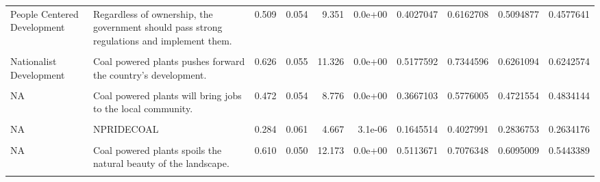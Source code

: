 \documentclass[
]{article}
\begin{document}
\begin{landscape}
\begin{table}[!h]
{\begin{tabular}[t]{l>{\raggedright\arraybackslash}p{4cm}rrrrrrrr}
\addlinespace
People Centered Development & Regardless of ownership, the government should pass strong regulations and implement them. & 0.509 & 0.054 & 9.351 & 0.0e+00 & 0.4027047 & 0.6162708 & 0.5094877 & 0.4577641\\
\cellcolor{gray!6}{Nationalist Development} & \cellcolor{gray!6}{MECHANISATION} & \cellcolor{gray!6}{0.656} & \cellcolor{gray!6}{0.056} & \cellcolor{gray!6}{11.682} & \cellcolor{gray!6}{0.0e+00} & \cellcolor{gray!6}{0.5460463} & \cellcolor{gray!6}{0.7662170} & \cellcolor{gray!6}{0.6561317} & \cellcolor{gray!6}{0.5556245}\\
Nationalist Development & Coal powered plants pushes forward the country's development. & 0.626 & 0.055 & 11.326 & 0.0e+00 & 0.5177592 & 0.7344596 & 0.6261094 & 0.6242574\\
\cellcolor{gray!6}{Nationalist Development} & \cellcolor{gray!6}{Coal powered plants brings economic prosperity to the surrounding regions.} & \cellcolor{gray!6}{0.547} & \cellcolor{gray!6}{0.054} & \cellcolor{gray!6}{10.086} & \cellcolor{gray!6}{0.0e+00} & \cellcolor{gray!6}{0.4408772} & \cellcolor{gray!6}{0.6535573} & \cellcolor{gray!6}{0.5472172} & \cellcolor{gray!6}{0.5535687}\\
NA & Coal powered plants will bring jobs to the local community. & 0.472 & 0.054 & 8.776 & 0.0e+00 & 0.3667103 & 0.5776005 & 0.4721554 & 0.4834144\\
\addlinespace
\cellcolor{gray!6}{NA} & \cellcolor{gray!6}{PRIDECOAL} & \cellcolor{gray!6}{0.338} & \cellcolor{gray!6}{0.062} & \cellcolor{gray!6}{5.485} & \cellcolor{gray!6}{0.0e+00} & \cellcolor{gray!6}{0.2173242} & \cellcolor{gray!6}{0.4590249} & \cellcolor{gray!6}{0.3381745} & \cellcolor{gray!6}{0.3081207}\\
NA & NPRIDECOAL & 0.284 & 0.061 & 4.667 & 3.1e-06 & 0.1645514 & 0.4027991 & 0.2836753 & 0.2634176\\
\cellcolor{gray!6}{NA} & \cellcolor{gray!6}{Coal powered plants poses a great risk to the health of people living around it.} & \cellcolor{gray!6}{0.702} & \cellcolor{gray!6}{0.056} & \cellcolor{gray!6}{12.572} & \cellcolor{gray!6}{0.0e+00} & \cellcolor{gray!6}{0.5927046} & \cellcolor{gray!6}{0.8116380} & \cellcolor{gray!6}{0.7021713} & \cellcolor{gray!6}{0.5798090}\\
NA & Coal powered plants spoils the natural beauty of the landscape. & 0.610 & 0.050 & 12.173 & 0.0e+00 & 0.5113671 & 0.7076348 & 0.6095009 & 0.5443389\\
\cellcolor{gray!6}{NA} & \cellcolor{gray!6}{Coal powered plants is leading to displacement of people from their land.} & \cellcolor{gray!6}{0.941} & \cellcolor{gray!6}{0.069} & \cellcolor{gray!6}{13.656} & \cellcolor{gray!6}{0.0e+00} & \cellcolor{gray!6}{0.8060444} & \cellcolor{gray!6}{1.0761975} & \cellcolor{gray!6}{0.9411209} & \cellcolor{gray!6}{0.7048765}\\
\bottomrule
\end{tabular}}
\end{table}
\end{landscape}
\end{document}
